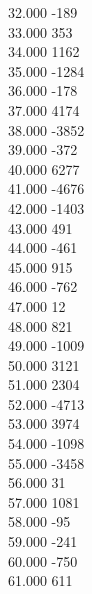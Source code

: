 { 32.000	-189 \\
 33.000	353 \\
 34.000	1162 \\
 35.000	-1284 \\
 36.000	-178 \\
 37.000	4174 \\
 38.000	-3852 \\
 39.000	-372 \\
 40.000	6277 \\
 41.000	-4676 \\
 42.000	-1403 \\
 43.000	491 \\
 44.000	-461 \\
 45.000	915 \\
 46.000	-762 \\
 47.000	12 \\
 48.000	821 \\
 49.000	-1009 \\
 50.000	3121 \\
 51.000	2304 \\
 52.000	-4713 \\
 53.000	3974 \\
 54.000	-1098 \\
 55.000	-3458 \\
 56.000	31 \\
 57.000	1081 \\
 58.000	-95 \\
 59.000	-241 \\
 60.000	-750 \\
 61.000	611 \\
}
